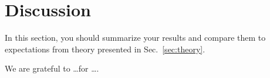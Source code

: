 \documentclass[sigconf, nonacm, natbib, screen, balance=False]{acmart}
\begin{document}
\section{Discussion}\label{sec:discussion}

In this section, you should summarize your results and compare them to
expectations from theory presented in Sec.~\ref{sec:theory}.

\begin{acks}
We are grateful to \dots for \dots.
\end{acks}






\end{document}
